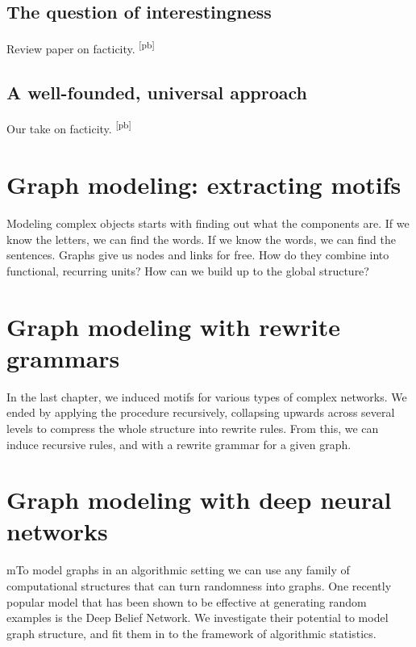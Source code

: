 \documentclass{thesis}
\newcommand{\pb}[1]{\textcolor{OliveGreen}{\small #1 \textsuperscript{[pb]} }}
\begin{document}
\section{The question of interestingness}

\pb{Review paper on facticity.}

\section{A well-founded, universal approach}

\pb{Our take on facticity.}

\chapter{Graph modeling: extracting motifs}

\begin{summary} Modeling complex objects starts with finding out what the components are. If we know the letters, we can find the words. If we know the words, we can find the sentences. Graphs give us nodes and links for free. How do they combine into functional, recurring units? How can we build up to the global structure?
\end{summary}

\chapter{Graph modeling with rewrite grammars}

\begin{summary} In the last chapter, we induced motifs for various types of complex networks. We ended by applying the procedure recursively, collapsing upwards across several levels to compress the whole structure into rewrite rules. From this, we can induce recursive rules, and with a rewrite grammar for a given graph.
\end{summary}

\chapter{Graph modeling with deep neural networks}

\begin{summary}mTo model graphs in an algorithmic setting we can use any family of computational structures that can turn randomness into graphs. One recently popular model that has been shown to be effective at generating random examples is the Deep Belief Network. We investigate their potential to model graph structure, and fit them in to the framework of algorithmic statistics.
\end{summary}
\end{document}
